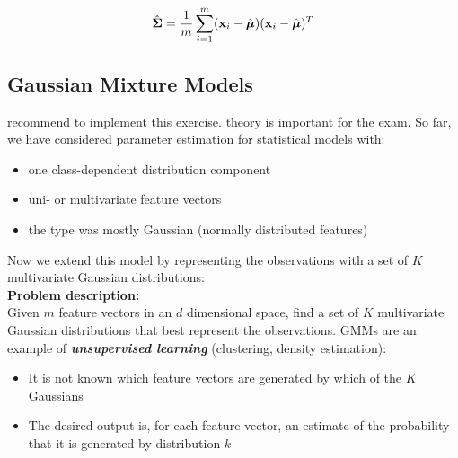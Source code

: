     \begin{displaymath}
      \hat{\mathbf{\Sigma}} = \frac{1}{m} \sum_{i=1}^m (\bm{\mathrm{x}}_i-\hat{\bm{\mathrm{\mu}}})
                                                    (\bm{\mathrm{x}}_i-\hat{\bm{\mathrm{\mu}}})^T
    \end{displaymath}
  
\subsection{Gaussian Mixture Models}

recommend to implement this exercise. theory is important for the exam. So far, we have considered parameter estimation for statistical models with:  
  \begin{itemize}
    \item one class-dependent distribution component  
    \item uni- or multivariate feature vectors  
    \item the type was mostly Gaussian (normally distributed features)
  \end{itemize}
   
  Now we extend this model by representing the observations with a set of $K$ multivariate Gaussian distributions:\\
 \textbf{Problem description:} \\
  
  Given $m$ feature vectors in an $d$ dimensional space, find a set of $K$ multivariate Gaussian distributions that best represent the observations. GMMs are an example of   \textbf{\emph{unsupervised learning}} (clustering, density estimation):  

  \begin{itemize}
    \item It is not known which feature vectors are generated by which of the $K$ Gaussians  
    \item The desired output is, for each feature vector, an estimate of the probability that it is generated by distribution $k$
  \end{itemize}
     
